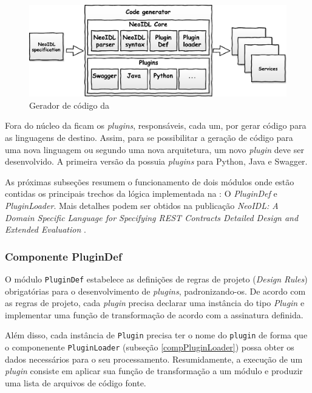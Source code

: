 \begin{figure}[h]
\begin{center}
\includegraphics[width=120mm,trim=0cm 0cm 0cm
0cm]{img/NeoIDLCodeGenerator.pdf}
\vspace{-.5cm}
\end{center}
\caption{Gerador de código da \neoidl{}}
\label{fig:programGenerator}
\end{figure}

Fora do núcleo da \neoidl{} ficam os \textit{plugins}, responsáveis,
cada um, por gerar código para as linguagens de destino. Assim, para se
possibilitar a geração de código para uma nova linguagem ou segundo uma nova arquitetura, um
novo \textit{plugin} deve ser desenvolvido. A primeira versão da \neoidl{}
possuia \textit{plugins} para Python, Java e Swagger.

As próximas subseções resumem o funcionamento de
dois módulos onde estão contidas os principais trechos da lógica implementada na \neoidl{}: O
\textit{PluginDef} e \textit{PluginLoader}. Mais detalhes podem ser obtidos na
publicação \textit{NeoIDL: A Domain Specific Language for Specifying REST
Contracts Detailed Design and Extended Evaluation} \cite{lima2015neoidl}.
 

\subsubsection{Componente PluginDef}{\label{sec:plugindef}}

O módulo \texttt{PluginDef} estabelece as definições de regras de projeto
(\textit{Design Rules}) obrigatórias para o desenvolvimento de
\textit{plugins}, padronizando-os. De acordo com as regras de projeto, cada
\textit{plugin} precisa declarar uma instância do tipo \emph{Plugin} e implementar uma função de
transformação de acordo com a assinatura definida.

Além disso, cada instância de  
\texttt{Plugin} precisa ter o nome do \texttt{plugin} de forma que o
componenente \texttt{PluginLoader} (subseção \ref{compPluginLoader}) possa obter
os dados necessários para o seu processamento.
Resumidamente, a execução de um \textit{plugin} consiste em aplicar sua função
de transformação a um módulo \neoidl{} e produzir uma lista de
arquivos de código fonte. 


